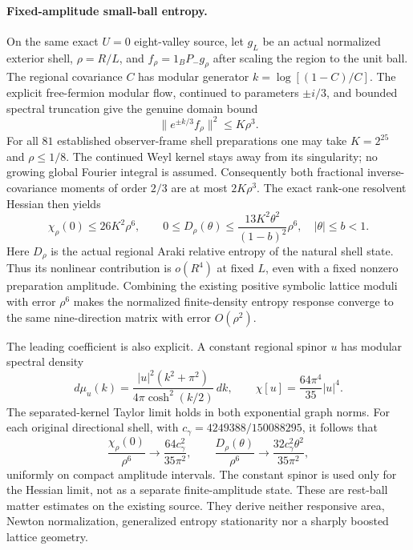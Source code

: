 \paragraph{Fixed-amplitude small-ball entropy.}
On the same exact $U=0$ eight-valley source, let $g_L$ be an actual
normalized exterior shell, $\rho=R/L$, and $f_\rho=1_B P_-g_\rho$
after scaling the region to the unit ball.  The regional covariance
$C$ has modular generator $k=\log[(1-C)/C]$.
The explicit free-fermion modular flow, continued to parameters
$\pm i/3$, and bounded spectral truncation give the genuine domain bound
\[
 \|e^{\pm k/3}f_\rho\|^2\leq K\rho^3.
\]
For all $81$ established observer-frame shell preparations one may take
$K=2^{25}$ and $\rho\leq1/8$.  The continued Weyl kernel stays away
from its singularity; no growing global Fourier integral is assumed.
Consequently both fractional inverse-covariance moments of order $2/3$
are at most $2K\rho^3$.  The exact rank-one resolvent Hessian then yields
\[
 \chi_\rho(0)\leq26K^2\rho^6,\qquad
 0\leq D_\rho(\theta)
 \leq\frac{13K^2\theta^2}{(1-b)^2}\rho^6,
 \quad |\theta|\leq b<1.
\]
Here $D_\rho$ is the actual regional Araki relative entropy of the
natural shell state.  Thus its nonlinear contribution is $o(R^4)$ at
fixed $L$, even with a fixed nonzero preparation amplitude.
Combining the existing positive symbolic lattice moduli with error
$\rho^6$ makes the normalized finite-density entropy response converge
to the same nine-direction matrix with error $O(\rho^2)$.

The leading coefficient is also explicit.  A constant regional spinor
$u$ has modular spectral density
\[
 d\mu_u(k)=\frac{|u|^2(k^2+\pi^2)}{4\pi\cosh^2(k/2)}\,dk,
 \qquad \chi[u]=\frac{64\pi^4}{35}|u|^4.
\]
The separated-kernel Taylor limit holds in both exponential graph
norms.  For each original directional shell, with
$c_\gamma=4249388/150088295$, it follows that
\[
 \frac{\chi_\rho(0)}{\rho^6}\longrightarrow
 \frac{64c_\gamma^2}{35\pi^2},\qquad
 \frac{D_\rho(\theta)}{\rho^6}\longrightarrow
 \frac{32c_\gamma^2\theta^2}{35\pi^2},
\]
uniformly on compact amplitude intervals.  The constant spinor is used
only for the Hessian limit, not as a separate finite-amplitude state.
These are rest-ball matter estimates on the existing source.  They
derive neither responsive area, Newton normalization, generalized
entropy stationarity nor a sharply boosted lattice geometry.
